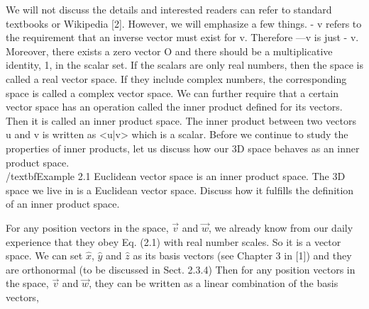 \documentclass{article}
\begin{document}
We will not discuss the details and interested readers can refer to standard textbooks or Wikipedia [2]. However, we will emphasize a few things. - v refers to the requirement that an inverse vector must exist for v. Therefore —v is just - v.
Moreover, there exists a zero vector O and there should be a multiplicative identity, 1, in the scalar set.
If the scalars are only real numbers, then the space is called a real vector space. If they include complex numbers, the corresponding space is called a complex vector
space.
We can further require that a certain vector space has an operation called the inner product defined for its vectors. Then it is called an inner product space. The inner product between two vectors u and v is written as <u|v> which is a scalar.
Before we continue to study the properties of inner products, let us discuss how our 3D space behaves as an inner product space.
\\[20pt]
/textbf{Example 2.1} Euclidean vector space is an inner product space. The 3D space we live in is a Euclidean vector space. Discuss how it fulfills the definition of an inner product space.

For any position vectors in the space, $\vec{v}$ and $\vec{w}$, we already know from our daily experience that they obey Eq. (2.1) with real number scales. So it is a vector space.
We can set $\hat{x}$, $\hat{y}$ and $\hat{z}$ as its basis vectors (see Chapter 3 in [1]) and they are orthonormal (to be discussed in Sect. 2.3.4) 
Then for any position vectors in the space, $\vec{v}$ and $\vec{w}$, they
can be written as a linear combination of the basis vectors,
\end{document}
